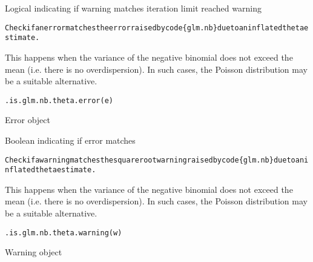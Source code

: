 \documentclass[letterpaper]{book}
\begin{document}
%
\begin{Value}
Logical indicating if warning matches iteration limit reached warning
\end{Value}
%
\begin{Description}
\begin{alltt}Check if an error matches the error raised by \bsl{}code\{glm.nb\} due to an inflated theta estimate.
\end{alltt}


This happens when the variance of the negative binomial does not exceed the mean (i.e. there is no overdispersion).
In such cases, the Poisson distribution may be a suitable alternative.
\end{Description}
%
\begin{Usage}
\begin{verbatim}
.is.glm.nb.theta.error(e)
\end{verbatim}
\end{Usage}
%
\begin{Arguments}
\begin{ldescription}
\item[\code{e}] Error object
\end{ldescription}
\end{Arguments}
%
\begin{Value}
Boolean indicating if error matches
\end{Value}
%
\begin{Description}
\begin{alltt}Check if a warning matches the square root warning raised by \bsl{}code\{glm.nb\} due to an inflated theta estimate.
\end{alltt}


This happens when the variance of the negative binomial does not exceed the mean (i.e. there is no overdispersion).
In such cases, the Poisson distribution may be a suitable alternative.
\end{Description}
%
\begin{Usage}
\begin{verbatim}
.is.glm.nb.theta.warning(w)
\end{verbatim}
\end{Usage}
%
\begin{Arguments}
\begin{ldescription}
\item[\code{w}] Warning object
\end{ldescription}
\end{Arguments}
\end{document}
